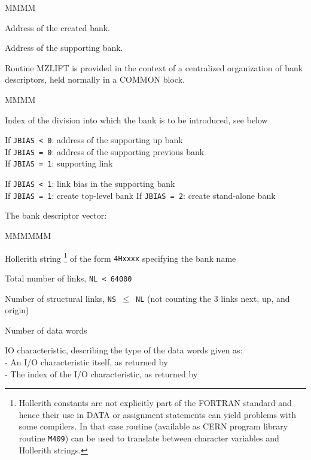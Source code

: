 \Odesc
\begin{DL}{MMMM}
\item[L*]Address of the created bank.
\item[*LSUP*]Address of the supporting bank.
\end{DL}
\par Routine
MZLIFT is provided in the context of a centralized organization
of bank descriptors, held normally in a COMMON block.
\Idesc
\begin{DL}{MMMM}
\item[IXDIV]Index of the division into which the bank is
to be introduced, see below
\item[*LSUP*]If {\tt JBIAS < 0}:  address of the supporting up bank\\
If {\tt JBIAS = 0}:  address of the supporting previous bank\\
If {\tt JBIAS = 1}:  supporting link
\item[JBIAS]If {\tt JBIAS < 1}:  link bias in the supporting bank\\
If {\tt JBIAS = 1}:  create top-level bank
If {\tt JBIAS = 2}:  create stand-alone bank
\item[MMBK]The bank descriptor vector:
\begin{DL}{MMMMMM}
\item[MMBK(1) = IDH]Hollerith string
\footnote{Hollerith
constants are not explicitly part of the FORTRAN standard and
hence their use in DATA or assignment statements can yield problems
with some compilers. In that case routine 
(available as CERN program library routine {\tt M409}) can be used
to translate between character variables and Hollerith strings.}
of the form {\tt 4Hxxxx} specifying the bank name
\item[MMBK(2) = NL]Total number of links, {\tt NL < 64000}
\item[MMBK(3) = NS]Number of structural links, {\tt NS $\leq$ NL}
(not counting the 3 links next, up, and origin)
\item[MMBK(4) = ND]Number of data words
\item[MMBK(5) = NIO]IO characteristic,
describing the type of the data words given as: \\
- An I/O characteristic itself, as returned by  \\
- The index of the I/O characteristic, as returned by \\

\end{DL}
\end{DL}
